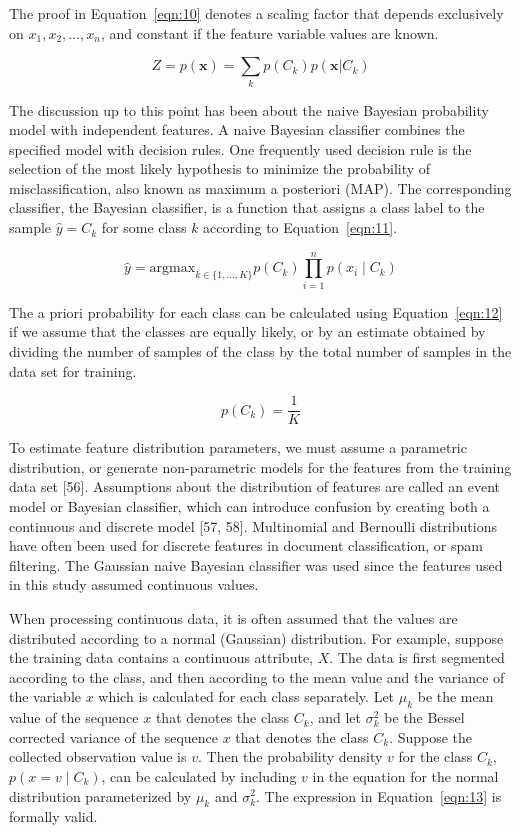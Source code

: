 \documentclass[preprint,12pt]{elsarticle}
\begin{document}
The proof in Equation~\ref{eqn:10} denotes a scaling factor that depends exclusively on $x_{1}, x_{2}, \ldots, x_{n}$, and constant if the feature variable values are known.

\begin{equation}
	Z = p(\mathbf{x}) = \sum_{k} p(C_{k}) p(\mathbf{x}|C_{k})
	\label{eqn:10}
\end{equation}

The discussion up to this point has been about the naive Bayesian probability model with independent features. A naive Bayesian classifier combines the specified model with decision rules. One frequently used decision rule is the selection of the most likely hypothesis to minimize the probability of misclassification, also known as maximum a posteriori (MAP). The corresponding classifier, the Bayesian classifier, is a function that assigns a class label to the sample $\hat{y} = C_{k}$ for some class $k$ according to Equation~\ref{eqn:11}.

\begin{equation}
	\hat{y} = \mathrm{argmax}_{k\in \{1, \ldots, K\}} p(C_{k}) \prod_{i=1}^{n} p(x_{i}\mid C_{k})
	\label{eqn:11}
\end{equation}

The a priori probability for each class can be calculated using Equation~\ref{eqn:12} if we assume that the classes are equally likely, or by an estimate obtained by dividing the number of samples of the class by the total number of samples in the data set for training.

\begin{equation}
	p(C_{k}) = \frac{1}{K}
	\label{eqn:12}
\end{equation}

To estimate feature distribution parameters, we must assume a parametric distribution, or generate non-parametric models for the features from the training data set [56]. Assumptions about the distribution of features are called an event model or Bayesian classifier, which can introduce confusion by creating both a continuous and discrete model [57, 58]. Multinomial and Bernoulli distributions have often been used for discrete features in document classification, or spam filtering. The Gaussian naive Bayesian classifier was used since the features used in this study assumed continuous values.

When processing continuous data, it is often assumed that the values are distributed according to a normal (Gaussian) distribution. For example, suppose the training data contains a continuous attribute, $X$. The data is first segmented according to the class, and then according to the mean value and the variance of the variable $x$ which is calculated for each class separately. Let $\mu_{k}$ be the mean value of the sequence $x$ that denotes the class $C_{k}$, and let $\sigma_{k}^{2}$ be the Bessel corrected variance of the sequence $x$ that denotes the class $C_{k}$. Suppose the collected observation value is $v$. Then the probability density $v$ for the class $C_{k}$, $p(x=v\mid C_{k})$, can be calculated by including $v$ in the equation for the normal distribution parameterized by $\mu_{k}$ and $\sigma_{k}^{2}$. The expression in Equation~\ref{eqn:13} is formally valid.
\end{document}
